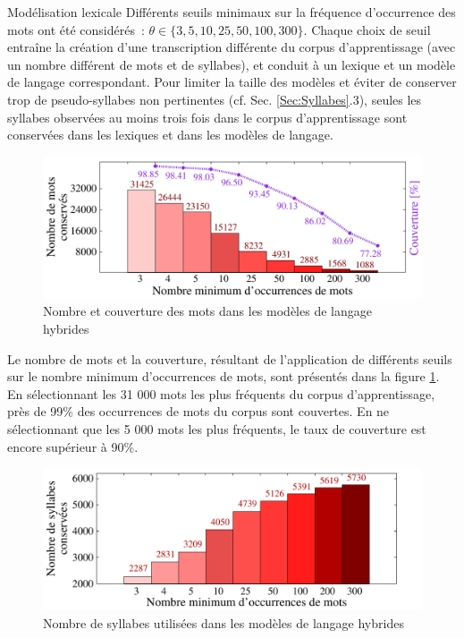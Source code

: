 \documentclass{style/these}
\begin{document}
\begin{part}{Modélisation lexicale}
Différents seuils minimaux sur la fréquence d'occurrence des mots ont été considérés~: $\theta \in \{3, 5, 10, 25, 50, 100, 300\}$. Chaque choix de seuil entraîne la création d'une transcription différente du corpus d'apprentissage (avec un nombre différent de mots et de syllabes), et conduit à un lexique et un modèle de langage correspondant. 
Pour limiter la taille des modèles et éviter de conserver trop de pseudo-syllabes non pertinentes (cf. Sec. \ref{Sec:Syllabes}.3), seules les syllabes observées au moins trois fois dans le corpus d'apprentissage sont conservées dans les lexiques et dans les modèles de langage.

\begin{figure}[h!]
\centering
\includegraphics[scale=0.64]{images/results/couverture_ws_minocc.pdf}
\caption{Nombre et couverture des mots dans les modèles de langage hybrides}
\label{Fig:ML-WS1}
\end{figure}

Le nombre de mots et la couverture, résultant de l'application de différents seuils sur le nombre minimum d'occurrences de mots, sont présentés dans la figure \ref{Fig:ML-WS1}.
En sélectionnant les 31 000 mots les plus fréquents du corpus d'apprentissage, près de 99\% des occurrences de mots du corpus sont couvertes. 
En ne sélectionnant que les 5 000 mots les plus fréquents, le taux de couverture est encore supérieur à 90\%.

\begin{figure}[h!]
\centering
\includegraphics[scale=0.64]{images/results/couverture_ws_s_minocc.pdf}
\caption{Nombre de syllabes utilisées dans les modèles de langage hybrides}
\label{Fig:ML-WS2}
\end{figure}


\end{part}
\end{document}
